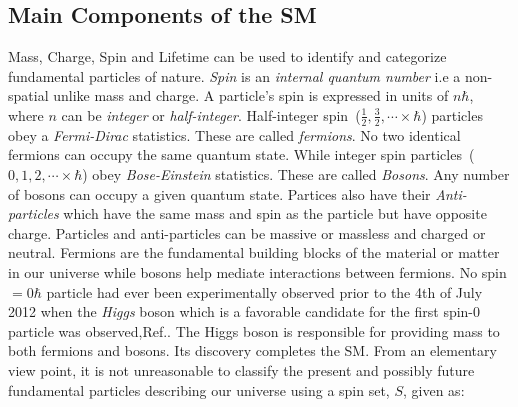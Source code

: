 \subsection{Main Components of the SM}
Mass, Charge, Spin and Lifetime can be used to identify and categorize fundamental particles of nature. \textit{Spin} is an \textit{internal quantum number} i.e a non-spatial unlike mass and charge. A particle's spin is expressed in units of $n\hbar$, where $n$ can be \textit{integer} or \textit{half-integer}.
Half-integer spin~($\frac{1}{2},\frac{3}{2},\cdots \times\hbar$) particles obey a \textit{Fermi-Dirac} statistics. These are called \textit{fermions}. No two identical fermions can occupy the same quantum state. While integer spin particles~($0,1,2,\cdots\times \hbar$) obey \textit{Bose-Einstein} statistics. These are called \textit{Bosons}. Any number of bosons can occupy a given quantum state.
Partices also have their \textit{Anti-particles} which have the same mass and spin as the particle but have opposite charge. Particles and anti-particles can be massive or massless and charged or neutral. 
Fermions are the fundamental building blocks of the material or matter in our universe while bosons help mediate interactions between fermions. No spin $=0\hbar$ particle had ever been experimentally observed prior to the 4th of July 2012 when the \textit{Higgs} boson which is a favorable candidate for the first spin-$0$ particle was observed,Ref.\cite{HIGGSD}. The Higgs boson is responsible for providing mass to both fermions and bosons. Its discovery completes the SM. From an elementary view point, it is not unreasonable to classify the present and possibly future fundamental particles describing our universe using a spin set, $S$, given as:

